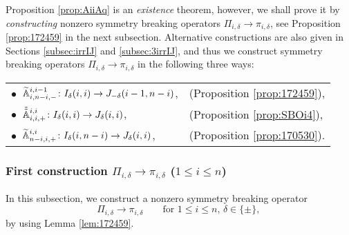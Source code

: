 Proposition \ref{prop:AiiAq} is an {\it{existence}} theorem,
 however,
 we shall prove it by {\it{constructing}}
 nonzero symmetry breaking operators 
 $\Pi_{i,\delta} \to \pi_{i,\delta}$, 
 see Proposition \ref{prop:172459}
 in the next subsection.  
Alternative constructions are also given in Sections \ref{subsec:irrIJ} and \ref{subsec:3irrIJ}, 
 and thus we construct symmetry breaking operators
 $\Pi_{i,\delta} \to \pi_{i,\delta}$
 in the following three ways:
\begin{center}\begin{tabular}{ll}
$\bullet$\ ${\widetilde{\mathbb{A}}}_{{i},{n-i},{-}}^{{i,i-1}} \colon I_{\delta}(i,i) \to J_{-\delta}(i-1,n-i)$, &
(Proposition \ref{prop:172459}), \\[0.5cm]
$\bullet$\ $\tilde{\tilde{{\mathbb{A}}}}_{{i},{i},{+}}^{{i,i}} \colon I_{\delta}(i,i) \to J_{\delta}(i,i)$, &
(Proposition \ref{prop:SBOi4}), \\[0.5cm]
$\bullet$\ ${\widetilde{\mathbb{A}}}_{{n-i},{i},{+}}^{{i,i}} \colon I_{\delta}(i,n-i) \to J_{\delta}(i,i)$, &
(Proposition \ref{prop:170530}).  
\end{tabular}\end{center}



\subsubsection{First construction $\Pi_{i,\delta} \to \pi_{i,\delta}$
 ($1 \le i \le n$)}
\label{subsec:IJdual}
In this subsection,
 we construct a nonzero symmetry breaking operator
\[
   \Pi_{i,\delta} \to \pi_{i,\delta}
   \qquad
  \text{for $1 \le i \le n$, $\delta \in \{\pm\}$, }
\]
by using Lemma \ref{lem:172459}.  

